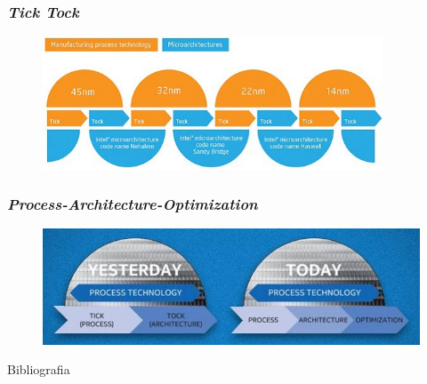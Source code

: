 \documentclass[aspectratio=169,
				xcolor=table]{beamer}
\begin{document}
	\begin{frame}
		\frametitle{\textit{Tick Tock}}
		\begin{figure}
					\centering
			\includegraphics[width=0.9\textwidth, keepaspectratio]{../figs/cap03/ticktock.jpg} 
		\end{figure}
	\end{frame}
	
	\begin{frame}
		\frametitle{\textit{Process-Architecture-Optimization}}
		\begin{figure}
					\centering
			\includegraphics[width=\textwidth, keepaspectratio]{../figs/cap03/pao.png} 
		\end{figure}		
	\end{frame}
	
	\begin{frame}{Bibliografia}
		\nocite{Englander2011}
		\nocite{Paixao2014}
		\nocite{Stallings2010}
    	
    	   	
	
	\end{frame}
	
	\begin{frame}{}
		\end{frame}	
\end{document}
